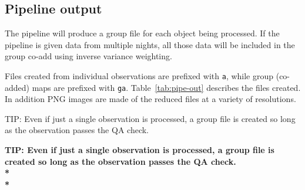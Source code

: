 \documentclass[twoside,11pt]{article}
\newcommand{\htmlref}[2]{#1}
\newenvironment{latexonly}{}{}
\newcommand{\latexhtml}[2]{#1}
\newcommand{\xlabel}[1]{}
\renewcommand{\_}{\texttt{\symbol{95}}}
\newenvironment{fmpage}[1]{\begin{lrbox}{\fmbox}\begin{minipage}{#1}}{\end{minipage}\end{lrbox}\fbox{\usebox{\fmbox}}}
\newcommand{\cref}[3]{\latexhtml{#1~\ref{#2}}{\htmlref{#3}{#2}}}
\begin{document}
\subsection{\xlabel{pl_output}Pipeline output}

The pipeline will produce a group file for each object being processed. If the pipeline is given data from multiple nights, all those data will be included in the group co-add using inverse variance weighting.

Files created from individual observations are prefixed with \texttt{a}, while group (co-added) maps are  prefixed with \texttt{ga}. \cref{Table}{tab:pipe-out}{the table below} describes the files created. In addition PNG images are made of the reduced files at a variety of resolutions.

\begin{latexonly}
\begin{center}
\begin{fmpage}{0.95\linewidth}
\vspace{0.1cm}
TIP: Even if just a single observation is processed, a group file is created so long as the observation passes the QA check.
\end{fmpage}
\end{center}
\end{latexonly}

\begin{htmlonly}
\textbf{TIP: Even if just a single observation is processed, a group file is created so long as the observation passes the QA check.\\*\\*}
\end{htmlonly}
\end{document}
